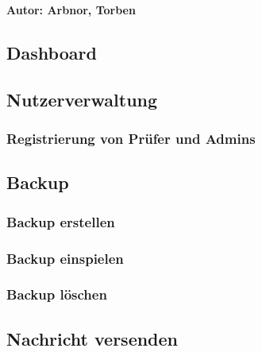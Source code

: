 \textbf{Autor: Arbnor, Torben} \\

\subsection{Dashboard}

\subsection{Nutzerverwaltung}
\subsubsection{Registrierung von Prüfer und Admins}  \label{sec:regPuA}


\subsection{Backup}
\subsubsection{Backup erstellen}
\subsubsection{Backup einspielen}
\subsubsection{Backup löschen}

\subsection{Nachricht versenden}

